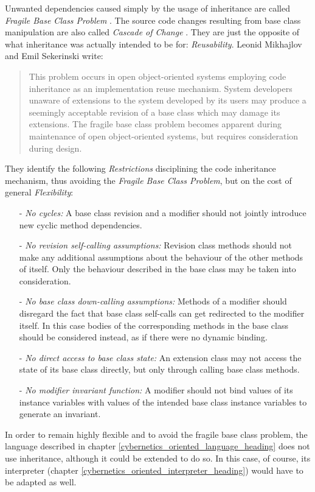 Unwanted dependencies caused simply by the usage of inheritance are called
\emph{Fragile Base Class Problem} \cite[section \emph{Layers}; p. 48]{buschmann}.
The source code changes resulting from base class manipulation are also called
\emph{Cascade of Change} \cite[Vorwort]{gruhn}. They are just the opposite of
what inheritance was actually intended to be for: \emph{Reusability}. Leonid
Mikhajlov and Emil Sekerinski \cite{mikhajlov} write:

\begin{quote}
    This problem occurs in open object-oriented systems employing code
    inheritance as an implementation reuse mechanism. System developers unaware
    of extensions to the system developed by its users may produce a seemingly
    acceptable revision of a base class which may damage its extensions.
    The fragile base class problem becomes apparent during maintenance of open
    object-oriented systems, but requires consideration during design.
\end{quote}

They identify the following \emph{Restrictions} \cite{mikhajlov} disciplining the
code inheritance mechanism, thus avoiding the \emph{Fragile Base Class Problem},
but on the cost of general \emph{Flexibility}:

\begin{itemize}
    \item[-] \emph{No cycles:} A base class revision and a modifier should not
        jointly introduce new cyclic method dependencies.
    \item[-] \emph{No revision self-calling assumptions:} Revision class methods
        should not make any additional assumptions about the behaviour of the
        other methods of itself. Only the behaviour described in the base class
        may be taken into consideration.
    \item[-] \emph{No base class down-calling assumptions:} Methods of a modifier
        should disregard the fact that base class self-calls can get redirected
        to the modifier itself. In this case bodies of the corresponding methods
        in the base class should be considered instead, as if there were no
        dynamic binding.
    \item[-] \emph{No direct access to base class state:} An extension class
        may not access the state of its base class directly, but only through
        calling base class methods.
    \item[-] \emph{No modifier invariant function:} A modifier should not bind
        values of its instance variables with values of the intended base class
        instance variables to generate an invariant.
\end{itemize}

In order to remain highly flexible and to avoid the fragile base class problem,
the language described in chapter \ref{cybernetics_oriented_language_heading}
does not use inheritance, although it could be extended to do so. In this case,
of course, its interpreter (chapter \ref{cybernetics_oriented_interpreter_heading})
would have to be adapted as well.
